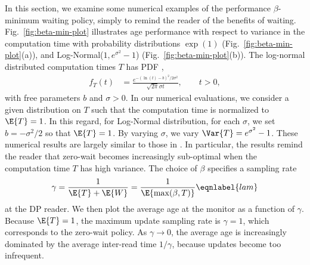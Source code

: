 \documentclass[conference, 10pt]{IEEEtran}
\newcommand{\sig}{\sigma}
\newcommand{\monage}{\hat{z}}
\begin{document}
In this section, we  examine some numerical examples of the performance $\beta$-minimum waiting policy, simply to remind the reader of the benefits of waiting. 
Fig.~\ref{fig:beta-min-plot} illustrates age performance with respect to variance in the computation time with probability distributions $\exp(1)$ (Fig.~\ref{fig:beta-min-plot}(a)), and Log-Normal($1, e^{\sig^2} - 1$) (Fig.~\ref{fig:beta-min-plot}(b)). 
The log-normal distributed computation times $T$ has PDF \cite{yates2014probability},
\begin{align}
f_T(t) &= %
\frac{e^{-(\ln(t) - b)^2/2\sig^2}}{\sqrt{2\pi}\sig t}, \qquad t > 0,
\end{align}
with free parameters $b$ and $\sig > 0$.
In our numerical evaluations, 
we consider a given distribution on $T$ such that the computation time is normalized to $\E{T}=1$. In this regard, for Log-Normal distribution,
for each $\sig$, we set $b = -\sig^2/2$ so that $\E{T} = 1$. By varying $\sigma$, we vary $\Var{T}=e^{\sigma^2}-1$.
These numerical results are largely similar to those in \cite{Sun-UBYKS-IT2017UpdateorWait,Yates-isit2015}.
In particular, the results remind the reader that zero-wait becomes increasingly sub-optimal when the computation time $T$ has high variance. 
The choice of $\beta$ specifies a sampling rate  
\begin{equation}
\gamma = \frac{1}{\E{T} + \E{W}} =\frac{1}{\E{\max(\beta,T)}}\eqnlabel{lam}
\end{equation}
at the DP reader. We then plot the average age at the monitor as a function of $\gamma$.  Because $\E{T}=1$, the maximum update sampling rate is $\gamma=1$, which corresponds to the zero-wait policy. As $\gamma\to 0$, the average age is increasingly dominated by the average inter-read time  $1/\gamma$, because  updates become too infrequent. 

\end{document}

